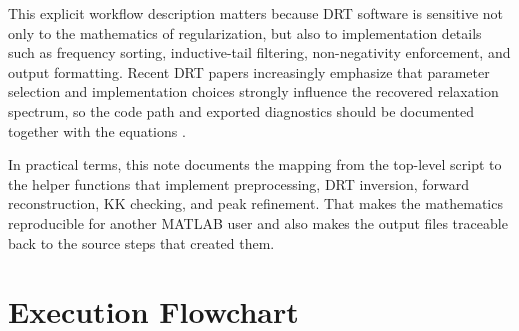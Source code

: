 \documentclass[11pt]{article}
\begin{document}
This explicit workflow description matters because DRT software is sensitive not only to the mathematics of regularization, but also to implementation details such as frequency sorting, inductive-tail filtering, non-negativity enforcement, and output formatting. Recent DRT papers increasingly emphasize that parameter selection and implementation choices strongly influence the recovered relaxation spectrum, so the code path and exported diagnostics should be documented together with the equations \cite{maradesa2023,carbone2025,ciucci2015,danzer2019}.

In practical terms, this note documents the mapping from the top-level script to the helper functions that implement preprocessing, DRT inversion, forward reconstruction, KK checking, and peak refinement. That makes the mathematics reproducible for another MATLAB user and also makes the output files traceable back to the source steps that created them.

\section{Execution Flowchart}
\end{document}
